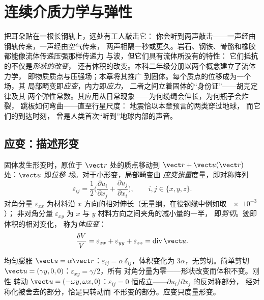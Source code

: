 \chapter{连续介质力学与弹性}\label{ch:b3:continuum-elasticity}

把耳朵贴在一根长钢轨上，远处有工人敲击它：
你会听到两声敲击——一声经由钢轨传来，一声经由空气传来，
两声相隔一秒或更久。岩石、钢铁、骨骼和橡胶都能像流体传递压强那样传递力
与波，但它们具有流体所没有的特性：
它们抵抗的不仅是\emph{形状的改变}，
还有体积的改变。本科二年级分册以两个概念建立了流体力学，
即物质质点与压强场；本章将其推广
到固体。每个质点的位移成为一个场，其
局部畸变即\emph{应变}，内力即\emph{应力}，
二者之间立着固体的“身份证”——胡克定律及其
两个弹性常数。其应用从日常现象——为何缆绳会伸长，为何瓶子会炸裂，
跳板如何弯曲——直至行星尺度：
地震恰以本章预言的两类穿过地球，
而它们的到达时刻，
曾是人类首次“听到”地球内部的声音。

\section{应变：描述形变}

\begin{definition}[位移场与应变张量]\label{def:b3:continuum-elasticity:strain}
固体发生形变时，原位于 $\vect r$ 处的质点移动到
$\vect r + \vect u(\vect r)$ 处：$\vect u$ 即\emph{位移
场}。对于小形变，局部畸变由
\emph{应变张量}度量，即对称阵列
\[
\varepsilon_{ij} = \frac12\Big(
 \frac{\partial u_i}{\partial x_j} + \frac{\partial u_j}{\partial x_i}
\Big) , \qquad i, j \in \{x, y, z\} .
\]
对角分量 $\varepsilon_{xx}$ 为材料沿
$x$ 方向的相对伸长（无量纲，在役钢缆中例如取 $\num{e-3}$）；
非对角分量 $\varepsilon_{xy}$ 为
$x$ 与 $y$ 材料方向之间夹角的减小量的一半，
即\emph{剪切}。迹即体积的相对变化，
称为\emph{体应变}：
\[
\frac{\delta V}{V} = \varepsilon_{xx} + \varepsilon_{yy} +
\varepsilon_{zz} = \operatorname{div}\vect u .
\]
\end{definition}

\begin{example}[三种基本形变]\label{ex:b3:continuum-elasticity:elementary}
均匀膨胀 $\vect u = \alpha\vect r$：$\varepsilon_{ij} =
\alpha\,\delta_{ij}$，体积变化为 $3\alpha$，无剪切。简单剪切
$\vect u = (\gamma y, 0, 0)$：$\varepsilon_{xy} = \gamma/2$，所有
对角分量为零——形状改变而体积不变。刚性
转动 $\vect u = (-\omega y, \omega x, 0)$：$\varepsilon_{ij} = 0$
恒成立——$\partial u_i/\partial x_j$ 的反对称部分，
经对称化被舍去的部分，恰是只转动而
不形变的部分。应变只度量形变。
\end{example}

